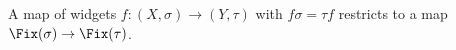 \begin{proposition}[Functoriality]\label{dm-0005}
A map of widgets $f\colon (X,\sigma)\to(Y,\tau)$ with $f\sigma = \tau f$ restricts to a map $\Fix(\sigma)\to\Fix(\tau)$.
\end{proposition}